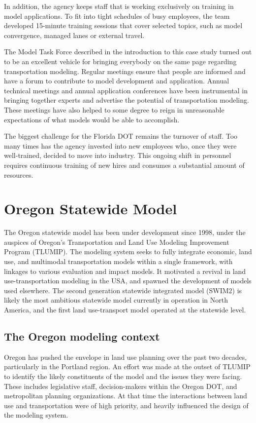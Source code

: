 In addition, the agency keeps staff that is working exclusively on training in model applications. To fit into tight schedules of busy employees, the team developed 15-minute training sessions that cover selected topics, such as model convergence, managed lanes or external travel.

The Model Task Force described in the introduction to this case study turned out to be an excellent vehicle for bringing everybody on the same page regarding transportation modeling. Regular meetings ensure that people are informed and have a forum to contribute to model development and application. Annual technical meetings and annual application conferences have been instrumental in bringing together experts and advertise the potential of transportation modeling. These meetings have also helped to some degree to reign in unreasonable expectations of what models would be able to accomplish.

The biggest challenge for the Florida DOT remains the turnover of staff. Too many times has the agency invested into new employees who, once they were well-trained, decided to move into industry. This ongoing shift in personnel requires continuous training of new hires and consumes a substantial amount of resources.

\section{Oregon Statewide Model}

The Oregon statewide model has been under development since 1998, under the auspices of Oregon's Transportation and Land Use Modeling Improvement Program (TLUMIP). The modeling system seeks to fully integrate economic, land use, and multimodal transportation models within a single framework, with linkages to various evaluation and impact models. It motivated a revival in land use-transportation modeling in the USA, and spawned the development of models used elsewhere. The second generation statewide integrated model (SWIM2) is likely the most ambitious statewide model currently in operation in North America, and the first land use-transport model operated at the statewide level.

\subsection{The Oregon modeling context}

Oregon has pushed the envelope in land use planning over the past two decades, particularly in the Portland region. An effort was made at the outset of TLUMIP to identify the likely constituents of the model and the issues they were facing. These includes legislative staff, decision-makers within the Oregon DOT, and metropolitan planning organizations. At that time the interactions between land use and transportation were of high priority, and heavily influenced the design of the modeling system.

